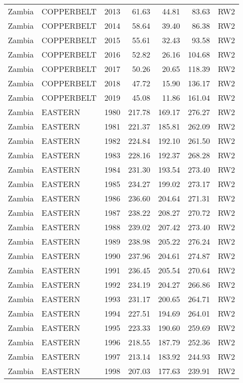 \begin{longtable}{lllrrrl}
  Zambia & COPPERBELT & 2013 & 61.63 & 44.81 & 83.63 & RW2 \\ 
  Zambia & COPPERBELT & 2014 & 58.64 & 39.40 & 86.38 & RW2 \\ 
  Zambia & COPPERBELT & 2015 & 55.61 & 32.43 & 93.58 & RW2 \\ 
  Zambia & COPPERBELT & 2016 & 52.82 & 26.16 & 104.68 & RW2 \\ 
  Zambia & COPPERBELT & 2017 & 50.26 & 20.65 & 118.39 & RW2 \\ 
  Zambia & COPPERBELT & 2018 & 47.72 & 15.90 & 136.17 & RW2 \\ 
  Zambia & COPPERBELT & 2019 & 45.08 & 11.86 & 161.04 & RW2 \\ 
  Zambia & EASTERN & 1980 & 217.78 & 169.17 & 276.27 & RW2 \\ 
  Zambia & EASTERN & 1981 & 221.37 & 185.81 & 262.09 & RW2 \\ 
  Zambia & EASTERN & 1982 & 224.84 & 192.10 & 261.50 & RW2 \\ 
  Zambia & EASTERN & 1983 & 228.16 & 192.37 & 268.28 & RW2 \\ 
  Zambia & EASTERN & 1984 & 231.30 & 193.54 & 273.40 & RW2 \\ 
  Zambia & EASTERN & 1985 & 234.27 & 199.02 & 273.17 & RW2 \\ 
  Zambia & EASTERN & 1986 & 236.60 & 204.64 & 271.31 & RW2 \\ 
  Zambia & EASTERN & 1987 & 238.22 & 208.27 & 270.72 & RW2 \\ 
  Zambia & EASTERN & 1988 & 239.02 & 207.42 & 273.40 & RW2 \\ 
  Zambia & EASTERN & 1989 & 238.98 & 205.22 & 276.24 & RW2 \\ 
  Zambia & EASTERN & 1990 & 237.96 & 204.61 & 274.87 & RW2 \\ 
  Zambia & EASTERN & 1991 & 236.45 & 205.54 & 270.64 & RW2 \\ 
  Zambia & EASTERN & 1992 & 234.19 & 204.27 & 266.86 & RW2 \\ 
  Zambia & EASTERN & 1993 & 231.17 & 200.65 & 264.71 & RW2 \\ 
  Zambia & EASTERN & 1994 & 227.51 & 194.69 & 264.01 & RW2 \\ 
  Zambia & EASTERN & 1995 & 223.33 & 190.60 & 259.69 & RW2 \\ 
  Zambia & EASTERN & 1996 & 218.55 & 187.79 & 252.36 & RW2 \\ 
  Zambia & EASTERN & 1997 & 213.14 & 183.92 & 244.93 & RW2 \\ 
  Zambia & EASTERN & 1998 & 207.03 & 177.63 & 239.91 & RW2 \\ 

\end{longtable}
